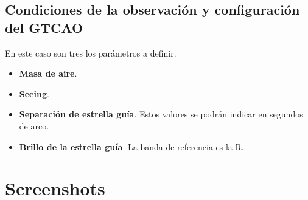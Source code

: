 \subsection{Condiciones de la observaci\'on y configuraci\'on del GTCAO}
En este caso son tres los par\'ametros a definir.
    \begin{itemize}
        \item \textbf{Masa de aire}.
        \item \textbf{Seeing}.
        \item \textbf{Separaci\'on de estrella gu\'ia}. Estos valores se podr\'an indicar en segundos de arco.
        \item \textbf{Brillo de la estrella gu\'ia}. La banda de referencia es la R.
    \end{itemize}

\section{Screenshots}

